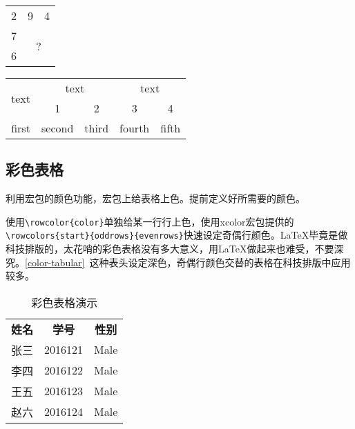 \begin{codeshow}
\centering
\begin{tabular}{|ccc|}
    \hline
    2 & 9 & 4 \\
    7 & \multicolumn{2}{c|}{\multirow{2}{*}{?}}\\
    6& & \\ \hline
\end{tabular}
\end{codeshow}

\begin{codeshow}
\centering
\begin{tabular}{ccccc}
    \toprule
    \multirow{2}{*}{text} & \multicolumn{2}{c}{text} & \multicolumn{2}{c}{text} \\
    \cmidrule(lr){2-3} \cmidrule(lr){4-5}
    & 1 & 2 & 3 & 4 \\
    \midrule
    first & second & third & fourth & fifth\\
    \bottomrule
\end{tabular}
\end{codeshow}

\subsection{彩色表格}

利用宏包的颜色功能，宏包上给表格上色。提前定义好所需要的颜色。

\begin{latex}
\end{latex}

使用\lstinline|\rowcolor{color}|单独给某一行行上色，使用xcolor宏包提供的\lstinline|\rowcolors{start}{oddrows}{evenrows}|快速设定奇偶行颜色。\LaTeX{}毕竟是做科技排版的，太花哨的彩色表格没有多大意义，用\LaTeX{}做起来也难受，不要深究。\autoref{color-tabular}~这种表头设定深色，奇偶行颜色交替的表格在科技排版中应用较多。

\begin{table}[!htb]
    \centering
    \caption{彩色表格演示}
    \label{color-tabular}
    \begin{tabular}{ccc}
        \rowcolor{header}
        \color{white} \textbf{姓名} &\color{white} \textbf{学号} &\color{white} \textbf{性别}\\
        张三 & 2016121 & Male\\
        李四 & 2016122 & Male\\
        王五 & 2016123 & Male\\
        赵六 & 2016124 & Male\\
    \end{tabular}
\end{table}

